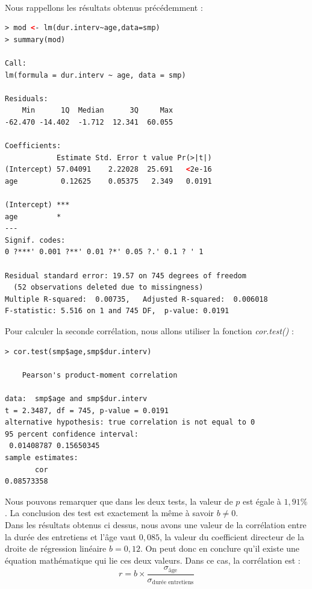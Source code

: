 \\
Nous rappellons les résultats obtenus précédemment : 
\begin{lstlisting}[language=html]
> mod <- lm(dur.interv~age,data=smp)
> summary(mod)

Call:
lm(formula = dur.interv ~ age, data = smp)

Residuals:
    Min      1Q  Median      3Q     Max 
-62.470 -14.402  -1.712  12.341  60.055 

Coefficients:
            Estimate Std. Error t value Pr(>|t|)
(Intercept) 57.04091    2.22028  25.691   <2e-16
age          0.12625    0.05375   2.349   0.0191
               
(Intercept) ***
age         *  
---
Signif. codes:  
0 ?***' 0.001 ?**' 0.01 ?*' 0.05 ?.' 0.1 ? ' 1

Residual standard error: 19.57 on 745 degrees of freedom
  (52 observations deleted due to missingness)
Multiple R-squared:  0.00735,	Adjusted R-squared:  0.006018 
F-statistic: 5.516 on 1 and 745 DF,  p-value: 0.0191
\end{lstlisting}
Pour calculer la seconde corrélation, nous allons utiliser la fonction \textit{cor.test()} : 

\begin{lstlisting}[language=html]
> cor.test(smp$age,smp$dur.interv)

	Pearson's product-moment correlation

data:  smp$age and smp$dur.interv
t = 2.3487, df = 745, p-value = 0.0191
alternative hypothesis: true correlation is not equal to 0
95 percent confidence interval:
 0.01408787 0.15650345
sample estimates:
       cor 
0.08573358 
\end{lstlisting}
Nous pouvons remarquer que dans les deux tests, la valeur de $p$ est égale à $1,91\%$. La conclusion des test est exactement la même à savoir \underline{$b \neq 0$}.\newline
\\
Dans les résultats obtenus ci dessus, nous avons une valeur de la corrélation entre la durée des entretiens et l'âge vaut $0,085$, la valeur du coefficient directeur de la droite de régression linéaire $b=0,12$. On peut donc en conclure qu'il existe une équation mathématique qui lie ces deux valeurs.\newline
Dans ce cas, la corrélation est : 
$$r = b \times \frac{\sigma_{\textrm{âge}}}{\sigma_{\textrm{durée entretiens}}}$$

